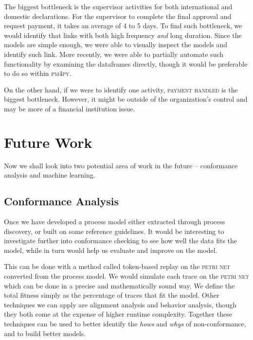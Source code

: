 \documentclass[conference]{IEEEtran}
\begin{document}
The biggest bottleneck is the supervisor activities for both international
and domestic declarations.  For the supervisor to complete
 the final approval and
request payment, it takes an average of 4 to 5 days.
To find such bottleneck, we would identify that
links with both high frequency \textit{and} long duration. Since the models
are simple enough, we were able to visually inspect the models and identify
such link.
More recently, we were able to partially automate
such functionality by examining the dataframes directly, though it would be
preferable to do so within \textsc{pm4py}.

On the other hand, if we
were to identify one activity, \textsc{payment handled}
is the biggest bottleneck. However,
it might be outside of the organization’s control and may be more of a
financial institution issue.


\section{Future Work}
\label{section-future}

Now we shall look into two potential area of work in the future --
conformance analysis and machine learning.

\subsection{Conformance Analysis}

Once we have developed a process model either extracted through process
discovery, or built on some reference guidelines. It would be
interesting to investigate further into conformance checking to see how
well the data fits the model, while in turn would help us evaluate and
improve on the model.

This can be done with a method called token-based replay on the
\textsc{petri net} converted from the process model. We would simulate
each trace on the \textsc{petri net} which can be done
in a precise and mathematically sound
way. We define the total fitness
simply as the percentage of traces that fit the model. Other techniques
we can apply are 
alignment analysis and behavior analysis, though
they both come at the expense of higher runtime complexity.
Together these techniques can be used to better identify the
\textit{hows} and \textit{whys} of
non-conformance, and to build better models.
\end{document}
